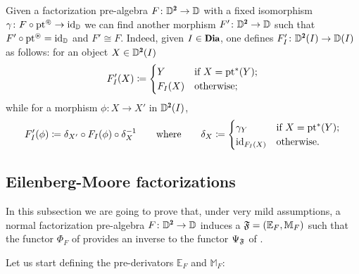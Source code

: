 \begin{remark}\label{normal_not_restrictive}
Given a factorization pre\hyp{}algebra $F\colon \D^\due\to \D$ with a fixed isomorphism $\gamma\colon F\circ \text{pt}^\protect{\tiny \oast} \to \operatorname{id}_{\mathbb{D}}$ we can find another morphism $F'\colon \D^\due\to \D$ such that $F'\circ \text{pt}^\protect{\tiny \oast} =\operatorname{id}_{\mathbb{D}}$ and $F'\cong F$. Indeed, given $I\in \Dia$, one defines $F'_I\colon \D^\due(I)\to \D(I)$ as follows: for an object $X\in \D^\due(I)$
\[
F'_I(X) \coloneqq \begin{cases}
Y&\text{if $X=\text{pt}^*(Y)$;}\\
F_I(X)&\text{otherwise;}
\end{cases}
\]
while for a morphism $\phi\colon X\to X'$ in $\D^\due(I)$, 
\[
F'_I(\phi) \coloneqq \delta_{X'}\circ F_I(\phi)\circ \delta_{X}^{-1}\qquad\text{where}\qquad
\delta_X \coloneqq \begin{cases}
\gamma_Y&\text{if $X=\text{pt}^*(Y)$;}\\
\operatorname{id}_{F_I(X)}&\text{otherwise.}
\end{cases}
\]
\end{remark}
\subsection{Eilenberg-Moore factorizations}\label{EM_subs}
In this subsection we are going to prove that, under very mild assumptions, a normal factorization pre\hyp{}algebra $F\colon \D^\due\to \D$ induces a \dfs $\mathfrak{F}=(\mathbb E_F,\mathbb M_F)$ such that the functor $\Phi_F$ of \adef{} provides an inverse to the functor $\Psi_{\mathfrak{F}}$ of \adef{}.

Let us start defining the pre-derivators $\mathbb E_F$ and $\mathbb M_F$:

